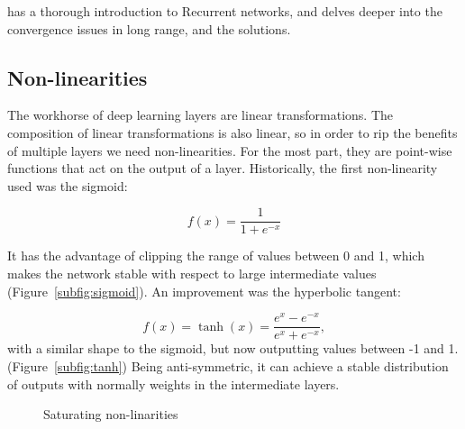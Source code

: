 \citet{unreasonable_RNN} has a thorough introduction to Recurrent networks, and \citet{colah_rnn} delves deeper into the convergence issues in long range, and the solutions.

\subsection{Non-linearities}
The workhorse of deep learning layers are linear transformations.
The composition of linear transformations is also linear, so in order to rip the benefits of multiple layers we need non-linearities.
For the most part, they are point-wise functions that act on the output of a layer.
Historically, the first non-linearity used was the sigmoid:

\begin{equation*}
f(x) = \frac{1}{1 + e^{- x}}
\end{equation*}

It has the advantage of clipping the range of values between 0 and 1, which makes the network stable with respect to large intermediate values (Figure~\ref{subfig:sigmoid}).
An improvement was the hyperbolic tangent:

\begin{equation*}
f(x) = \tanh(x) = \frac{e^x - e^{-x}}{e^x + e^{-x}},
\end{equation*}
with a similar shape to the sigmoid, but now outputting values between -1 and 1. (Figure~\ref{subfig:tanh})
Being anti-symmetric, it can achieve a stable distribution of outputs with normally weights in the intermediate layers.

\begin{figure}[tb]
	\hfil
	\caption{Saturating non-linarities}\label{fig:non_linear}
\end{figure}

